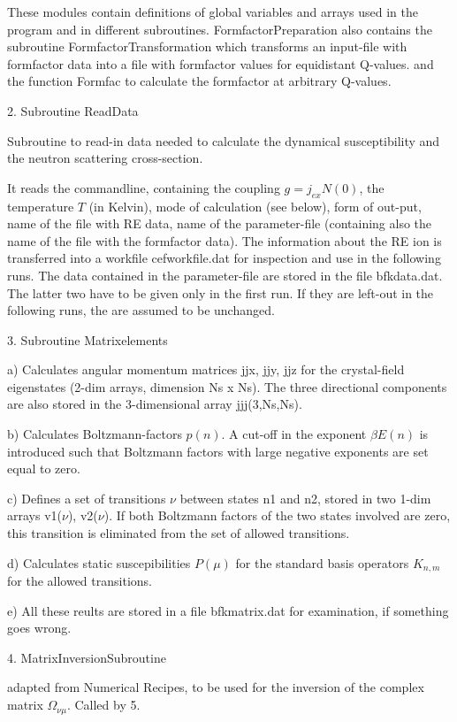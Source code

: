 These modules contain definitions of global variables and arrays 
used in the program and in different  subroutines. 
FormfactorPreparation also contains the
subroutine FormfactorTransformation which transforms an input-file with
formfactor data into a file with formfactor values for equidistant Q-values. 
and the function Formfac to calculate the formfactor at
arbitrary Q-values.
  
2. Subroutine ReadData

Subroutine to read-in data needed to calculate the dynamical susceptibility
and the neutron scattering cross-section.

It reads the commandline, containing the coupling $g=j_{ex} N(0)$,  
the temperature  $T$ (in Kelvin), mode of calculation (see below), form of out-put, 
name of the
file with RE data, name of the parameter-file (containing also the name of
the file with the formfactor data). The information about the RE ion is
transferred into a workfile cefworkfile.dat for inspection and use in the
following runs. The data contained in the parameter-file are stored in the
file bfkdata.dat. The latter two have to be given only in the first run. If
they are left-out  in the following runs, the are assumed    to be
unchanged.

3. Subroutine Matrixelements

a) Calculates angular momentum matrices jjx, jjy, jjz for the crystal-field eigenstates
(2-dim arrays, dimension Ns x Ns). The three directional components are also
stored in the 3-dimensional array jjj(3,Ns,Ns). 

b) Calculates Boltzmann-factors $p(n)$. A cut-off in the exponent $\beta
E(n)$ is introduced such that Boltzmann factors with large negative
exponents
are set equal to zero. 

c) Defines  a set of transitions  $\nu$  between states
n1 and n2, stored in two  1-dim
arrays v1($\nu$), v2($\nu$). If both Boltzmann factors of the two states
involved are zero, this transition is eliminated from the set of allowed
transitions.  

d) Calculates static suscepibilities $P(\mu)$ for the standard basis operators
$K_{n,m}$ for the allowed transitions.  

e) All these reults are stored in a  file bfkmatrix.dat for examination, if
something goes wrong.
 

4. MatrixInversionSubroutine

adapted from Numerical Recipes, to be used for the inversion of the complex
matrix $\Omega_{\nu\mu}$. Called by 5. 

